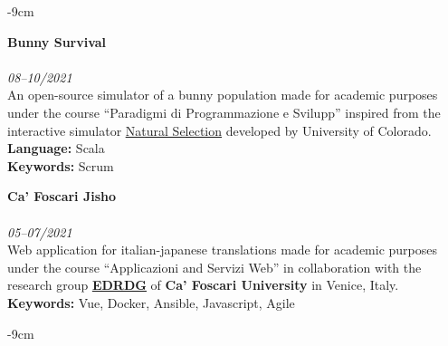 \documentclass[10pt,a4paper]{altacv}
\begin{document}
\begin{adjustwidth}{}{-9cm}
    \divider

    \textbf{Bunny Survival}\\
    \\
    \textit{08--10/2021}\\ \smallskip
    An open-source simulator of a bunny population made for academic purposes under the course ``Paradigmi di Programmazione e Svilupp'' inspired from the interactive simulator \href{https://phet.colorado.edu/en/simulations/natural-selection}{\underline{Natural Selection}} developed by University of Colorado.\\ \smallskip
    \textbf{Language:} Scala\\
    \textbf{Keywords:} Scrum

    \divider

    \textbf{\textbf{Ca' Foscari Jisho}}\\
    \\
    \textit{05--07/2021} \\ \smallskip
    Web application for italian-japanese translations made for academic purposes under the course ``Applicazioni and Servizi Web'' in collaboration with the research group \href{http://www.edrdg.org}{\underline{\textbf{EDRDG}}} of \textbf{Ca' Foscari University} in Venice, Italy.\\ \smallskip
    \textbf{Keywords:} Vue, Docker, Ansible, Javascript, Agile

    \divider
\end{adjustwidth}

\begin{adjustwidth}{}{-9cm}


    \divider
\end{adjustwidth}
\end{document}
